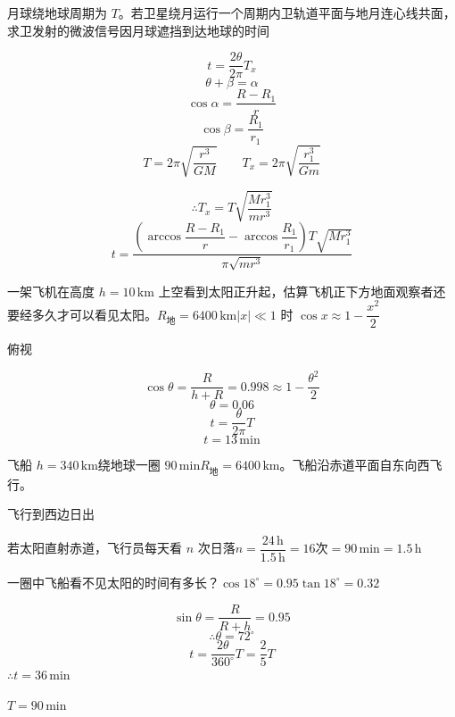 \begin{problem}[1.]
月球绕地球周期为 $T$。若卫星绕月运行一个周期内卫轨道平面与地月连心线共面，求卫发射的微波信号因月球遮挡到达地球的时间%
\begin{solution}
\[ t=\frac{2\theta}{2\pi}T_x \]
\[ \theta+\beta=\alpha \]
\[ \cos\alpha=\frac{R-R_1}{r} \]
\[ \cos\beta=\frac{R_1}{r_1} \]
\[ T=2\pi\sqrt{\frac{r^3}{GM}}\qquad T_x=2\pi\sqrt{\frac{r_1^3}{Gm}} \]
\begin{center}
\end{center}
\[ \therefore T_x=T\sqrt{\frac{Mr_1^3}{mr^3}} \]
\[ t=\frac{\left(\arccos\dfrac{R-R_1}{r}-\arccos\dfrac{R_1}{r_1}\right)T\sqrt{Mr_1^3}}{\pi\sqrt{mr^3}} \]
\end{solution}
\end{problem}

\begin{problem}[2.]
一架飞机在高度 $h=10\,\mathrm{km}$ 上空看到太阳正升起，估算飞机正下方地面观察者还要经多久才可以看见太阳。$R_{\text{地}}=6400\,\mathrm{km}$\quad $|x|\ll1$ 时 $\cos x\approx1-\dfrac{x^2}{2}$
\begin{solution}
俯视

\[ \cos\theta=\frac{R}{h+R}=0.998\approx1-\frac{\theta^2}{2} \]
\[ \theta=0.06 \]
\[ t=\frac{\theta}{2\pi}T \]
\[ t=13\,\mathrm{min} \]
\end{solution}
\end{problem}

\begin{problem}[3.]
飞船 $h=340\,\mathrm{km}$\quad 绕地球一圈 $90\,\mathrm{min}$\quad $R_{\text{地}}=6400\,\mathrm{km}$。飞船沿赤道平面自东向西飞行。

飞行到西边日出

若太阳直射赤道，飞行员每天看 $n$ 次日落\quad $n=\dfrac{24\,\mathrm{h}}{1.5\,\mathrm{h}}=16$次\quad {}$=90\,\mathrm{min}=1.5\,\mathrm{h}$

一圈中飞船看不见太阳的时间有多长？\quad $\cos18^\circ=0.95$\quad $\tan18^\circ=0.32$
\begin{solution}
\[ \sin\theta=\frac{R}{R+h}=0.95 \]
\[ \therefore\theta=72^\circ \]
\[ t=\frac{2\theta}{360^\circ}T=\frac{2}{5}T \]
\quad $\therefore t=36\,\mathrm{min}$%

$T=90\,\mathrm{min}$
\end{solution}
\end{problem}


